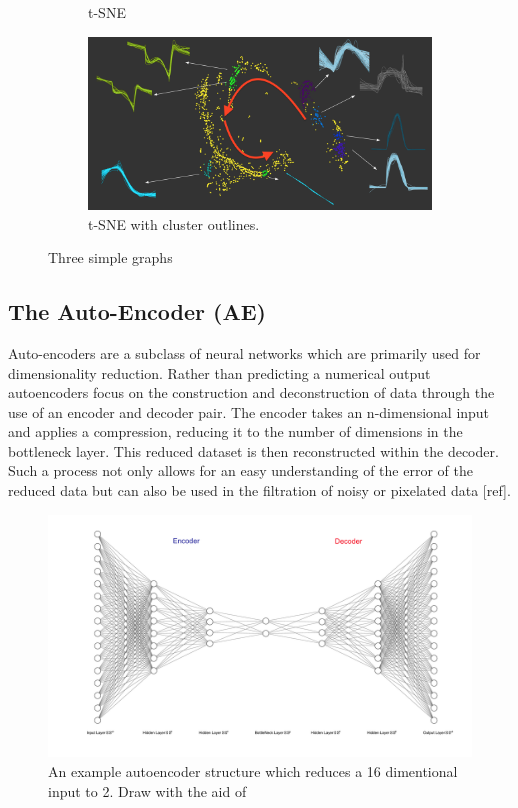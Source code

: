 \begin{figure}[H]
\begin{subfigure}[b]{0.495\textwidth}
         \caption{t-SNE}
         \label{fig:tsnec}
     \end{subfigure}
     \hfill \hfill
     \begin{subfigure}[b]{\textwidth}
         \centering
         \includegraphics[width=\textwidth]{4fig/ptsneall.png}
         \caption{t-SNE with cluster outlines.}
         \label{fig:tco}
     \end{subfigure}
        \caption{Three simple graphs}
        \label{fig:threegraphs}
\end{figure}




\subsection{The Auto-Encoder (AE)}
Auto-encoders are a subclass of neural networks which are primarily used for dimensionality reduction. Rather than predicting a numerical output autoencoders focus on the construction and deconstruction of data through the use of an encoder and decoder pair. The encoder takes an n-dimensional input and applies a compression, reducing it to the number of dimensions in the bottleneck layer. This reduced dataset is then reconstructed within the decoder. Such a process not only allows for an easy understanding of the error of the reduced data but can also be used in the filtration of noisy or pixelated data [ref].\\


\begin{figure}[H]
\includegraphics[width=\textwidth]{4fig/ae.pdf}
\caption{An example autoencoder structure which reduces a 16 dimentional input to 2. Draw with the aid of \cite{drawae}}
\end{figure}


